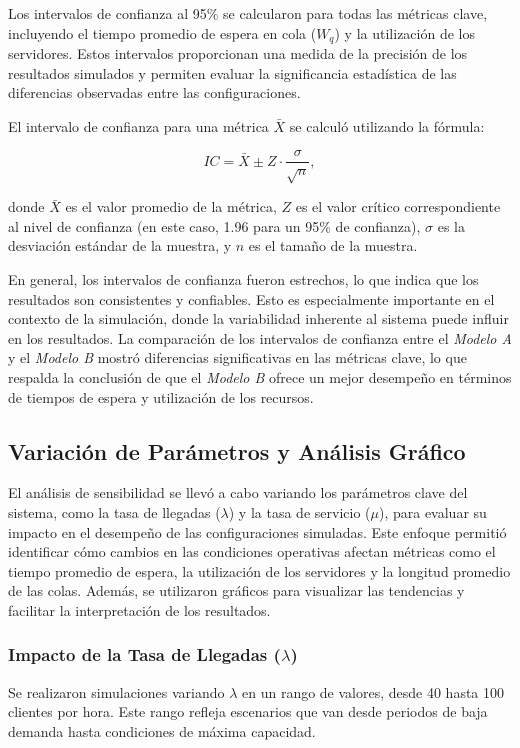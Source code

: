 \documentclass[a4paper,12pt]{article}
\begin{document}
Los intervalos de confianza al 95\% se calcularon para todas las métricas clave, incluyendo el tiempo promedio de espera en cola (\( W_q \)) y la utilización de los servidores. Estos intervalos proporcionan una medida de la precisión de los resultados simulados y permiten evaluar la significancia estadística de las diferencias observadas entre las configuraciones.

El intervalo de confianza para una métrica \( \bar{X} \) se calculó utilizando la fórmula:

\[
IC = \bar{X} \pm Z \cdot \frac{\sigma}{\sqrt{n}},
\]

donde \( \bar{X} \) es el valor promedio de la métrica, \( Z \) es el valor crítico correspondiente al nivel de confianza (en este caso, 1.96 para un 95\% de confianza), \( \sigma \) es la desviación estándar de la muestra, y \( n \) es el tamaño de la muestra.

En general, los intervalos de confianza fueron estrechos, lo que indica que los resultados son consistentes y confiables. Esto es especialmente importante en el contexto de la simulación, donde la variabilidad inherente al sistema puede influir en los resultados. La comparación de los intervalos de confianza entre el \textit{Modelo A} y el \textit{Modelo B} mostró diferencias significativas en las métricas clave, lo que respalda la conclusión de que el \textit{Modelo B} ofrece un mejor desempeño en términos de tiempos de espera y utilización de los recursos.

\subsection{Variación de Parámetros y Análisis Gráfico}

El análisis de sensibilidad se llevó a cabo variando los parámetros clave del sistema, como la tasa de llegadas (\( \lambda \)) y la tasa de servicio (\( \mu \)), para evaluar su impacto en el desempeño de las configuraciones simuladas. Este enfoque permitió identificar cómo cambios en las condiciones operativas afectan métricas como el tiempo promedio de espera, la utilización de los servidores y la longitud promedio de las colas. Además, se utilizaron gráficos para visualizar las tendencias y facilitar la interpretación de los resultados.

\subsubsection{Impacto de la Tasa de Llegadas (\( \lambda \))}
Se realizaron simulaciones variando \( \lambda \) en un rango de valores, desde 40 hasta 100 clientes por hora. Este rango refleja escenarios que van desde periodos de baja demanda hasta condiciones de máxima capacidad.
\end{document}
